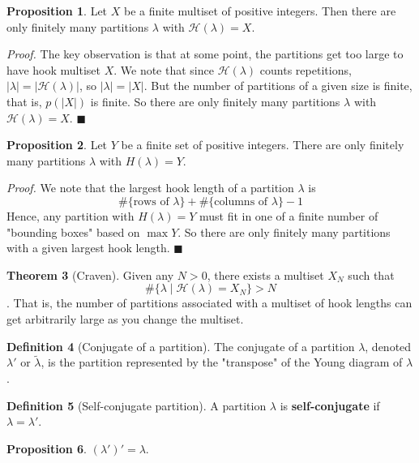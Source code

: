 \documentclass{article}
\theoremstyle{definition}
\newtheorem{thm}{Theorem}[section]
\theoremstyle{definition}
\newtheorem{defn}[thm]{Definition}
\theoremstyle{definition}
\newtheorem{prop}[thm]{Proposition}
\begin{document}
\begin{prop}
    Let $X$ be a finite multiset of positive integers. Then there are only finitely many partitions $\lambda$ with $\mathcal{H}(\lambda) = X$.

    \textit{Proof.} The key observation is that at some point, the partitions get too large to have hook multiset $X$. We note that since $\mathcal{H}(\lambda)$ counts repetitions, $|\lambda| = |\mathcal{H}(\lambda)|$, so $|\lambda| = |X|$. But the number of partitions of a given size is finite, that is, $p(|X|)$ is finite. So there are only finitely many partitions $\lambda$ with $\mathcal{H}(\lambda) = X$. $\blacksquare$ 
\end{prop}

\begin{prop}
    Let $Y$ be a finite set of positive integers. There are only finitely many partitions $\lambda$ with $H(\lambda) = Y$.

    \textit{Proof.} We note that the largest hook length of a partition $\lambda$ is 
    $$\#\{\text{rows of } \lambda\} + \#\{\text{columns of }\lambda\} - 1$$
    Hence, any partition with $H(\lambda) = Y$ must fit in one of a finite number of "bounding boxes" based on $\max Y$. So there are only finitely many partitions with a given largest hook length. $\blacksquare$ 
    
\end{prop}

\begin{thm}[Craven]
    Given any $N >0$, there exists a multiset $X_N$ such that 
    $$\#\{\lambda \mid \mathcal{H}(\lambda) = X_N\}>N$$.
    That is, the number of partitions associated with a multiset of hook lengths can get arbitrarily large as you change the multiset. 
\end{thm}

\begin{defn}[Conjugate of a partition]
    The conjugate of a partition $\lambda$, denoted $\lambda '$ or $\tilde{\lambda}$, is the partition represented by the "transpose" of the Young diagram of $\lambda$. 
\end{defn}

\begin{defn}[Self-conjugate partition]
    A partition $\lambda$ is \textbf{self-conjugate} if $\lambda = \lambda'$.
\end{defn}

\begin{prop}
    $(\lambda ')'=\lambda$.
\end{prop}
\end{document}
